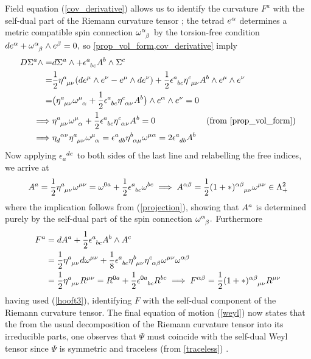\documentclass[a4paper,12pt, onecolumn, notitlepage]{article}
\theoremstyle{definition}
\theoremstyle{remark}
\newcommand{\al}{\alpha}
\newcommand{\w}{\omega}
\newcommand{\m}{\mu}
\newcommand{\n}{\nu}
\newcommand{\e}{\epsilon}
\newcommand{\hooft}[3]{\eta\indices{^{#1}_{#2}_{#3}}}
\newcommand{\ihooft}[3]{\eta\indices{_{#1}^{#2}^{#3}}}
\begin{document}
Field equation (\ref{cov_derivative}) allows us to identify the curvature $F^{a}$ with the self-dual part of the Riemann curvature tensor \cite{capovilla_1993}; the tetrad $e\indices{^\al}$ determines a metric compatible spin connection $\w\indices{^\al_\beta}$ by the torsion-free condition $de\indices{^\al} + \w\indices{^\al_\beta}\wedge e\indices{^\beta}=0,$ so \cref{prop_vol_form,cov_derivative} imply
\begin{align*}
	D\Sigma\indices{^a}\wedge =& d\Sigma\indices{^a}\wedge + \e\indices{^a_b_c}A\indices{^b}\wedge\Sigma\indices{^c}\\
	=&\frac{1}{2}\hooft{a}{\m}{\n}(de\indices{^\m}\wedge e\indices{^\n} - e\indices{^\m}\wedge de\indices{^\n}) +\frac{1}{2}\e\indices{^a_b_c}\hooft{c}{\m}{\n}A^{b}\wedge e^{\m}\wedge e^{\n}\\
	=&\big(\hooft{a}{\m}{\n}\w\indices{^\m_\al} +\frac{1}{2}\e\indices{^a_b_c}\hooft{c}{\al}{\n}A^{b}\big)\wedge e^{\al}\wedge e^{\n}=0\\
	\implies& \hooft{a}{\m}{\n}\w\indices{^\m_\al} +\frac{1}{2}\e\indices{^a_b_c}\hooft{c}{\al}{\n}A^{b}=0\qquad\qquad\qquad (\text{from \ref{prop_vol_form})}\\
	\implies& \ihooft{d}{\al}{\n}\hooft{a}{\m}{\n}\w\indices{^\m_\al}=\e\indices{^a_d_b}\hooft{b}{\al}{\m}\w\indices{^\m^\al}=2\e\indices{^a_d_b}A^{b}
\end{align*}
Now applying $\e\indices{_a^d^e}$ to both sides of the last line and relabelling the free indices, we arrive at
\begin{align*}
	A\indices{^a}=\frac{1}{2}\hooft{a}{\m}{\n}\w\indices{^\m^\n} = \w\indices{^0^a} + \frac{1}{2} \e\indices{^a_b_c}\w\indices{^b^c}
	\implies A^{\al\beta} = \frac{1}{2}(1+\ast)\indices{^\al^\beta_\m_\n}\w\indices{^\m^\n}\in\Lambda^{2}_{+}
\end{align*}
where the implication follows from (\ref{projection}), showing that $A\indices{^a}$ is determined purely by the self-dual part of the spin connection $\w\indices{^\al_\beta}.$ Furthermore
\begin{align*}
	F\indices{^a} &= dA\indices{^a} + \frac{1}{2}\e\indices{^a_b_c}A\indices{^b}\wedge A\indices{^c}\\
	&=\frac{1}{2}\hooft{a}{\m}{\n}d\w\indices{^\m^\n}+\frac{1}{8}\e\indices{^a_b_c}\hooft{b}{\m}{\n}\hooft{c}{\al}{\beta}\w\indices{^\m^\n} \w\indices{^\al^\beta}\\
	&=\frac{1}{2}\hooft{a}{\m}{\n}R\indices{^\m^\n}= R^{0a}+\frac{1}{2}\e\indices{^0^a_b_c}R^{bc}
	\implies F\indices{^\al^\beta} = \frac{1}{2}(1+\ast)\indices{^\al^\beta_\m_\n}R\indices{^\m^\n}
\end{align*}
having used (\ref{hooft3}), identifying $F$ with the self-dual component of the Riemann curvature tensor. The final equation of motion (\ref{weyl}) now states that the from the usual decomposition of the Riemann curvature tensor into its irreducible parts, one observes that $\Psi$ must coincide with the self-dual Weyl tensor since $\Psi$ is symmetric and traceless (from \ref{traceless}) \cite{capovilla_1993}.\\
	
\end{document}
